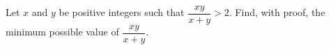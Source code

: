 Let $x$ and $y$ be positive integers such that $\dfrac{xy}{x+y}>2$. Find, with proof, the minimum possible value of $\dfrac{xy}{x+y}$.
